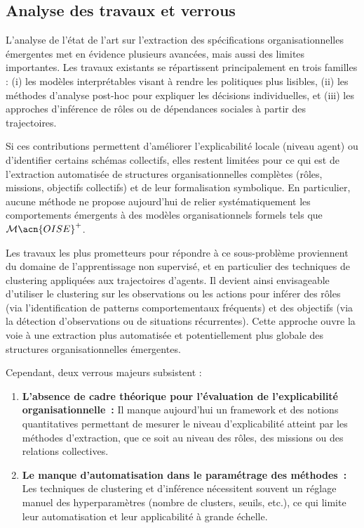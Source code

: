 \subsection*{Analyse des travaux et verrous}

L’analyse de l’état de l’art sur l’extraction des spécifications organisationnelles émergentes met en évidence plusieurs avancées, mais aussi des limites importantes. Les travaux existants se répartissent principalement en trois familles : (i) les modèles interprétables visant à rendre les politiques plus lisibles, (ii) les méthodes d’analyse post-hoc pour expliquer les décisions individuelles, et (iii) les approches d’inférence de rôles ou de dépendances sociales à partir des trajectoires.

Si ces contributions permettent d’améliorer l’explicabilité locale (niveau agent) ou d’identifier certains schémas collectifs, elles restent limitées pour ce qui est de l’extraction automatisée de structures organisationnelles complètes (rôles, missions, objectifs collectifs) et de leur formalisation symbolique. En particulier, aucune méthode ne propose aujourd’hui de relier systématiquement les comportements émergents à des modèles organisationnels formels tels que $\mathcal{M}\acn{OISE}^+$.

Les travaux les plus prometteurs pour répondre à ce sous-problème proviennent du domaine de l’apprentissage non supervisé, et en particulier des techniques de clustering appliquées aux trajectoires d’agents. Il devient ainsi envisageable d’utiliser le clustering sur les observations ou les actions pour inférer des rôles (via l’identification de patterns comportementaux fréquents) et des objectifs (via la détection d’observations ou de situations récurrentes). Cette approche ouvre la voie à une extraction plus automatisée et potentiellement plus globale des structures organisationnelles émergentes.

Cependant, deux verrous majeurs subsistent :
\begin{enumerate}
  \item \textbf{L’absence de cadre théorique pour l’évaluation de l’explicabilité organisationnelle~:} Il manque aujourd’hui un framework et des notions quantitatives permettant de mesurer le niveau d’explicabilité atteint par les méthodes d’extraction, que ce soit au niveau des rôles, des missions ou des relations collectives.
  \item \textbf{Le manque d’automatisation dans le paramétrage des méthodes~:} Les techniques de clustering et d’inférence nécessitent souvent un réglage manuel des hyperparamètres (nombre de clusters, seuils, etc.), ce qui limite leur automatisation et leur applicabilité à grande échelle.
\end{enumerate}

